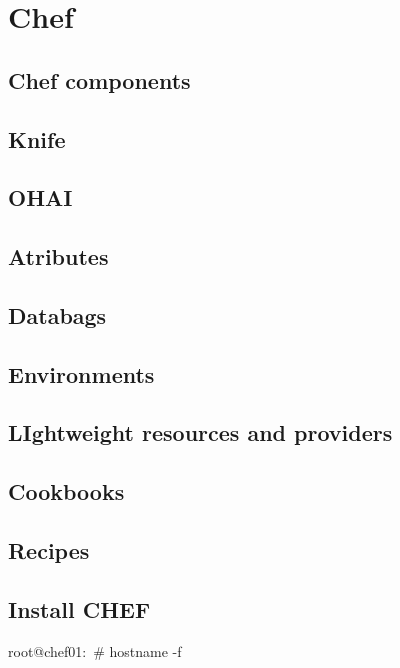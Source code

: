 \chapter{Chef}

\section{Chef components}

\section{Knife}

\section{OHAI}

\section{Atributes}

\section{Databags}

\section{Environments}

\section{LIghtweight resources and providers}

\section{Cookbooks}

\section{Recipes}

\section{Install CHEF}


\begin{codelisting}
\label{code:hostname}
\codecaption{}
\begin{code}
root@chef01:~# hostname -f
\end{code}
\end{codelisting}

